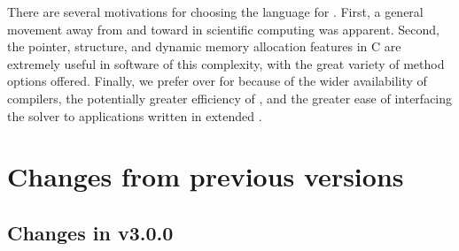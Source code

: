 There are several motivations for choosing the {\CC} language for {\cvode}.
First, a general movement away from {\F} and toward {\CC} in scientific
computing was apparent.  Second, the pointer, structure, and dynamic
memory allocation features in C are extremely useful in software of
this complexity, with the great variety of method options offered.
Finally, we prefer {\CC} over {\CPP} for {\cvode} because of the wider
availability of {\CC} compilers, the potentially greater efficiency of {\CC},
and the greater ease of interfacing the solver to applications written
in extended {\F}.

\section{Changes from previous versions}

\subsection*{Changes in v3.0.0}

